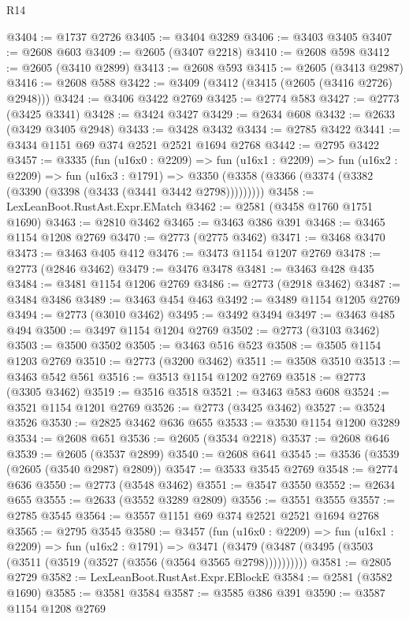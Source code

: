 \begin{lexlean}{R14}
\begin{coremodule}
@3404 := @1737 @2726
@3405 := @3404 @3289
@3406 := @3403 @3405
@3407 := @2608 @603
@3409 := @2605 (@3407 @2218)
@3410 := @2608 @598
@3412 := @2605 (@3410 @2899)
@3413 := @2608 @593
@3415 := @2605 (@3413 @2987)
@3416 := @2608 @588
@3422 := @3409 (@3412 (@3415 (@2605 (@3416 @2726) @2948)))
@3424 := @3406 @3422 @2769
@3425 := @2774 @583
@3427 := @2773 (@3425 @3341)
@3428 := @3424 @3427
@3429 := @2634 @608
@3432 := @2633 (@3429 @3405 @2948)
@3433 := @3428 @3432
@3434 := @2785 @3422
@3441 := @3434 @1151 @69 @374 @2521 @2521 @1694 @2768
@3442 := @2795 @3422
@3457 := @3335
    (fun (u16x0 : @2209) =>
    fun (u16x1 : @2209) =>
    fun (u16x2 : @2209) =>
    fun (u16x3 : @1791) =>
    @3350 (@3358 (@3366 (@3374 (@3382 (@3390 (@3398 (@3433 (@3441 @3442 @2798)))))))))
@3458 := LexLeanBoot.RustAst.Expr.EMatch
@3462 := @2581 (@3458 @1760 @1751 @1690)
@3463 := @2810 @3462
@3465 := @3463 @386 @391
@3468 := @3465 @1154 @1208 @2769
@3470 := @2773 (@2775 @3462)
@3471 := @3468 @3470
@3473 := @3463 @405 @412
@3476 := @3473 @1154 @1207 @2769
@3478 := @2773 (@2846 @3462)
@3479 := @3476 @3478
@3481 := @3463 @428 @435
@3484 := @3481 @1154 @1206 @2769
@3486 := @2773 (@2918 @3462)
@3487 := @3484 @3486
@3489 := @3463 @454 @463
@3492 := @3489 @1154 @1205 @2769
@3494 := @2773 (@3010 @3462)
@3495 := @3492 @3494
@3497 := @3463 @485 @494
@3500 := @3497 @1154 @1204 @2769
@3502 := @2773 (@3103 @3462)
@3503 := @3500 @3502
@3505 := @3463 @516 @523
@3508 := @3505 @1154 @1203 @2769
@3510 := @2773 (@3200 @3462)
@3511 := @3508 @3510
@3513 := @3463 @542 @561
@3516 := @3513 @1154 @1202 @2769
@3518 := @2773 (@3305 @3462)
@3519 := @3516 @3518
@3521 := @3463 @583 @608
@3524 := @3521 @1154 @1201 @2769
@3526 := @2773 (@3425 @3462)
@3527 := @3524 @3526
@3530 := @2825 @3462 @636 @655
@3533 := @3530 @1154 @1200 @3289
@3534 := @2608 @651
@3536 := @2605 (@3534 @2218)
@3537 := @2608 @646
@3539 := @2605 (@3537 @2899)
@3540 := @2608 @641
@3545 := @3536 (@3539 (@2605 (@3540 @2987) @2809))
@3547 := @3533 @3545 @2769
@3548 := @2774 @636
@3550 := @2773 (@3548 @3462)
@3551 := @3547 @3550
@3552 := @2634 @655
@3555 := @2633 (@3552 @3289 @2809)
@3556 := @3551 @3555
@3557 := @2785 @3545
@3564 := @3557 @1151 @69 @374 @2521 @2521 @1694 @2768
@3565 := @2795 @3545
@3580 := @3457
    (fun (u16x0 : @2209) =>
    fun (u16x1 : @2209) =>
    fun (u16x2 : @1791) =>
    @3471 (@3479 (@3487 (@3495 (@3503 (@3511 (@3519 (@3527 (@3556 (@3564 @3565 @2798))))))))))
@3581 := @2805 @2729
@3582 := LexLeanBoot.RustAst.Expr.EBlockE
@3584 := @2581 (@3582 @1690)
@3585 := @3581 @3584
@3587 := @3585 @386 @391
@3590 := @3587 @1154 @1208 @2769

\end{coremodule}
\end{lexlean}
